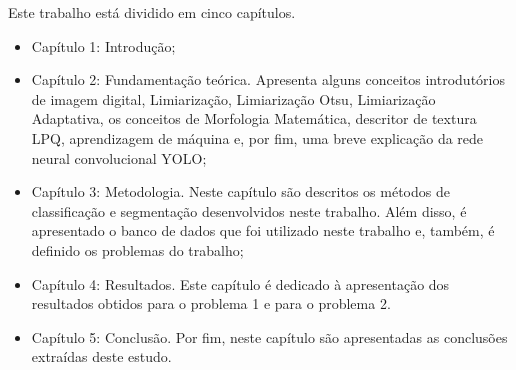 Este trabalho está dividido em cinco capítulos.

\begin{itemize}
	
	\item Capítulo 1: Introdução;
	
	\item Capítulo 2: Fundamentação teórica. Apresenta alguns conceitos introdutórios de imagem digital, Limiarização, Limiarização Otsu, Limiarização Adaptativa, os conceitos de Morfologia Matemática, descritor de textura LPQ, aprendizagem de máquina e, por fim, uma breve explicação da rede neural convolucional YOLO;
	
	\item Capítulo 3: Metodologia. Neste capítulo são descritos os métodos de classificação e segmentação desenvolvidos neste trabalho. Além disso, é apresentado o banco de dados que foi utilizado neste trabalho e, também, é definido os problemas do trabalho;
	
	\item Capítulo 4: Resultados. Este capítulo é dedicado à apresentação dos resultados obtidos para o problema 1 e para o problema 2.
	
	\item Capítulo 5: Conclusão. Por fim, neste capítulo são apresentadas as conclusões extraídas deste estudo.
	
\end{itemize}
